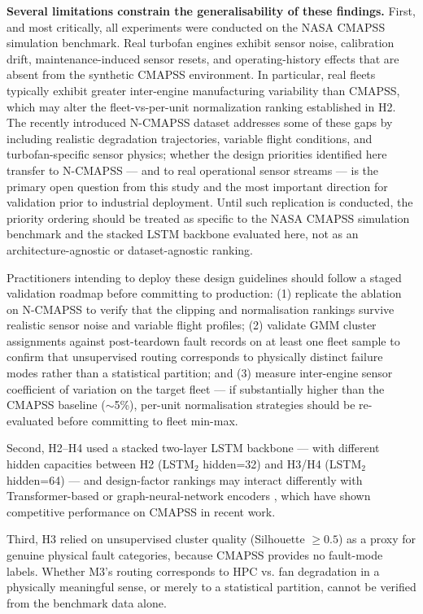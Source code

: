 \documentclass[preprint,10pt]{elsarticle}
\begin{document}
\textbf{Several limitations constrain the generalisability of these findings.} First, and most critically, all experiments were conducted on the NASA CMAPSS simulation benchmark. Real turbofan engines exhibit sensor noise, calibration drift, maintenance-induced sensor resets, and operating-history effects that are absent from the synthetic CMAPSS environment. In particular, real fleets typically exhibit greater inter-engine manufacturing variability than CMAPSS, which may alter the fleet-vs-per-unit normalization ranking established in H2. The recently introduced N-CMAPSS dataset \cite{ref16} addresses some of these gaps by including realistic degradation trajectories, variable flight conditions, and turbofan-specific sensor physics; whether the design priorities identified here transfer to N-CMAPSS — and to real operational sensor streams — is the primary open question from this study and the most important direction for validation prior to industrial deployment. Until such replication is conducted, the priority ordering should be treated as specific to the NASA CMAPSS simulation benchmark and the stacked LSTM backbone evaluated here, not as an architecture-agnostic or dataset-agnostic ranking.

Practitioners intending to deploy these design guidelines should follow a staged validation roadmap before committing to production: (1) replicate the ablation on N-CMAPSS to verify that the clipping and normalisation rankings survive realistic sensor noise and variable flight profiles; (2) validate GMM cluster assignments against post-teardown fault records on at least one fleet sample to confirm that unsupervised routing corresponds to physically distinct failure modes rather than a statistical partition; and (3) measure inter-engine sensor coefficient of variation on the target fleet --- if substantially higher than the CMAPSS baseline ($\sim$5\%), per-unit normalisation strategies should be re-evaluated before committing to fleet min-max.

Second, H2--H4 used a stacked two-layer LSTM backbone --- with different hidden capacities between H2 (LSTM$_2$ hidden=32) and H3/H4 (LSTM$_2$ hidden=64) --- and design-factor rankings may interact differently with Transformer-based or graph-neural-network encoders \cite{ref08,ref11,ref13,ref14}, which have shown competitive performance on CMAPSS in recent work.

Third, H3 relied on unsupervised cluster quality (Silhouette $\geq 0.5$) as a proxy for genuine physical fault categories, because CMAPSS provides no fault-mode labels. Whether M3's routing corresponds to HPC vs. fan degradation in a physically meaningful sense, or merely to a statistical partition, cannot be verified from the benchmark data alone.
\end{document}
